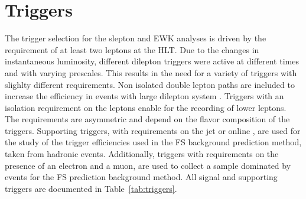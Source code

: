 \section{Triggers}
The trigger selection for the slepton and EWK analyses is driven by the requirement of at least two leptons at the HLT.
Due to the changes in instantaneous luminosity, different dilepton triggers were active at different times and with varying prescales. 
This results in the need for a variety of triggers with slighlty different requirements.
Non isolated double lepton paths are included to increase the efficiency in events with large dilepton system \pt. 
Triggers with an isolation requirement on the leptons enable for the recording of lower \pt leptons. 
The \pt requirements are asymmetric and depend on the flavor composition of the triggers.
Supporting triggers, with requirements on the jet \HT or online \ptmiss, are used for the study of the trigger efficiencies used in the FS background prediction method, taken from hadronic events. 
Additionally, triggers with requirements on the presence of an electron and a muon, are used to collect a sample dominated by \ttbar events for the FS prediction background method.
All signal and supporting triggers are documented in Table~\ref{tab:triggers}.                                                                                                        

